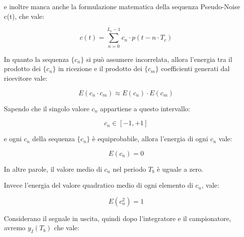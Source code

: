 e inoltre manca anche la formulazione matematica della sequenza Pseudo-Noise 
c(t), che vale: 

{
    \Large 
    \begin{equation}
        c(t)
        =
        \sum_{n = 0}^{L_c - 1}
        c_n \cdot p(t - n \cdot T_c)
    \end{equation}
}

In quanto la sequenza $\{ c_n \}$ si può assumere incorrelata, 
allora l'energia tra il prodotto dei $\{ c_n\}$ in ricezione 
e il prodotto dei $\{ c_m\}$ coefficienti generati dal ricevitore vale: 

{
    \Large 
    \begin{equation}
        E(c_n \cdot c_m)
        \approx 
        E(c_n)
        \cdot 
        E(c_m)
    \end{equation}
}

Sapendo che il singolo valore $c_n$ appartiene a questo intervallo: 

{
    \Large 
    \begin{equation}
        c_n \in [-1, +1]
    \end{equation}
}

e ogni $c_n$ della sequenza $\{ c_n\}$ è equiprobabile, 
allora l'energia di ogni $c_n$ vale: 

{
    \Large 
    \begin{equation}
        E (c_n)
        = 
        0
    \end{equation}
}

In altre parole, 
il valore medio di $c_n$ nel periodo $T_b$ è uguale a zero. \newline 

Invece l'energia del valore quadratico medio di ogni elemento di $c_n$, 
vale: 

{
    \Large 
    \begin{equation}
        E(c_n^{2})
        = 
        1
    \end{equation}
}

Considerano il segnale in uscita, 
quindi dopo l'integratore e il campionatore, 
avremo $y_I (T_b)$ che vale: 

